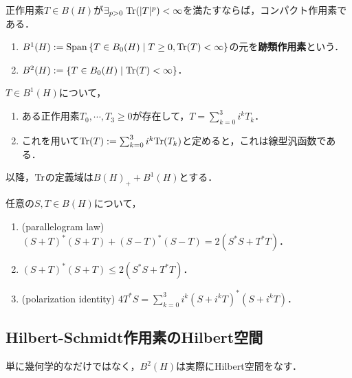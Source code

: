 \documentclass[uplatex,dvipdfmx]{jsreport}
\begin{document}
\begin{lemma}
    正作用素$T\in B(H)$が$\exists_{p>0}\;\mathrm{Tr}(\lvert T\rvert^p)<\infty$を満たすならば，コンパクト作用素である．
\end{lemma}

\begin{definition}\mbox{}\label{def-trace-class-Hilbert-Schmidt}
    \begin{enumerate}
        \item $B^1(H):=\mathrm{Span}\left\{T\in B_0(H)\mid T\ge0,\mathrm{Tr}(T)<\infty\right\}$の元を\textbf{跡類作用素}という．
        \item $B^2(H):=\left\{T\in B_0(H)\mid\mathrm{Tr}(T)<\infty\right\}$．
    \end{enumerate}
\end{definition}

\begin{lemma}[跡の延長]
    $T\in B^1(H)$について，
    \begin{enumerate}
        \item ある正作用素$T_0,\cdots,T_3\ge0$が存在して，$T=\sum_{k=0}^3i^kT_k$．
        \item これを用いて$\mathrm{Tr}(T):=\sum_{k=0}^3i^k\mathrm{Tr}(T_k)$と定めると，これは線型汎函数である．
    \end{enumerate}
    以降，$\mathrm{Tr}$の定義域は$B(H)_++B^1(H)$とする．
\end{lemma}

\begin{lemma}[作用素の中線定理と極化恒等式]
    任意の$S,T\in B(H)$について，
    \begin{enumerate}
        \item (parallelogram law) $(S+T)^*(S+T)+(S-T)^*(S-T)=2(S^*S+T^*T)$．
        \item $(S+T)^*(S+T)\le 2(S^*S+T^*T)$．
        \item (polarization identity) $4T^*S=\sum^3_{k=0}i^k(S+i^kT)^*(S+i^kT)$．
    \end{enumerate}
\end{lemma}

\subsection{Hilbert-Schmidt作用素のHilbert空間}

\begin{tcolorbox}[colframe=ForestGreen, colback=ForestGreen!10!white,breakable,colbacktitle=ForestGreen!40!white,coltitle=black,fonttitle=\bfseries\sffamily,
title=]
    単に幾何学的なだけではなく，$B^2(H)$は実際にHilbert空間をなす．
\end{tcolorbox}
\end{document}
